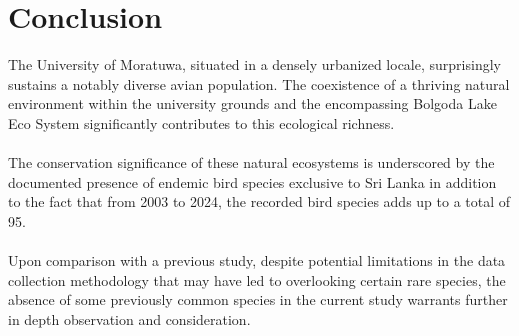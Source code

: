\chapter{Conclusion}

The University of Moratuwa, situated in a densely urbanized locale, surprisingly sustains a notably diverse avian population. The coexistence of a thriving natural environment within the university grounds and the encompassing Bolgoda Lake Eco System significantly contributes to this ecological richness.
\\\\
The conservation significance of these natural ecosystems is underscored by the documented presence of endemic bird species exclusive to Sri Lanka in addition to the fact that from 2003 to 2024, the recorded bird species adds up to a total of 95.
\\\\
Upon comparison with a previous study, despite potential limitations in the data collection methodology that may have led to overlooking certain rare species, the absence of some previously common species in the current study warrants further in depth observation and consideration. 